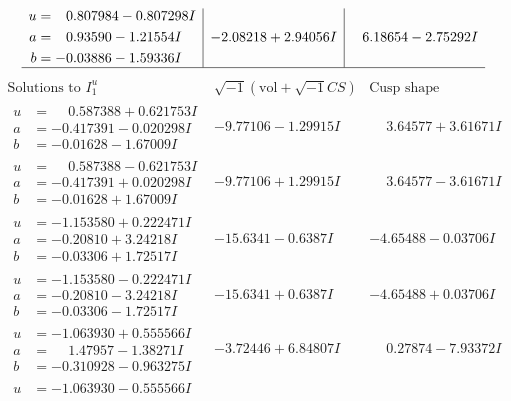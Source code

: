 \documentclass[1p]{elsarticle_modified}
\theoremstyle{definition}
\newcommand{\I}{\sqrt{-1}}
\begin{document}
$$\begin{array}{c|c|c}
\begin{aligned}
u &= \phantom{-}0.807984 - 0.807298 I \\
a &= \phantom{-}0.93590 - 1.21554 I \\
b &= -0.03886 - 1.59336 I\end{aligned}
 & -2.08218 + 2.94056 I & \phantom{-}6.18654 - 2.75292 I\\
 \hline 
 \end{array}$$\newpage$$\begin{array}{c|c|c}  
\text{Solutions to }I^u_{1}& \I (\text{vol} + \sqrt{-1}CS) & \text{Cusp shape}\\
 \hline 
\begin{aligned}
u &= \phantom{-}0.587388 + 0.621753 I \\
a &= -0.417391 - 0.020298 I \\
b &= -0.01628 - 1.67009 I\end{aligned}
 & -9.77106 - 1.29915 I & \phantom{-}3.64577 + 3.61671 I \\ \hline\begin{aligned}
u &= \phantom{-}0.587388 - 0.621753 I \\
a &= -0.417391 + 0.020298 I \\
b &= -0.01628 + 1.67009 I\end{aligned}
 & -9.77106 + 1.29915 I & \phantom{-}3.64577 - 3.61671 I \\ \hline\begin{aligned}
u &= -1.153580 + 0.222471 I \\
a &= -0.20810 + 3.24218 I \\
b &= -0.03306 + 1.72517 I\end{aligned}
 & -15.6341 - 0.6387 I & -4.65488 - 0.03706 I \\ \hline\begin{aligned}
u &= -1.153580 - 0.222471 I \\
a &= -0.20810 - 3.24218 I \\
b &= -0.03306 - 1.72517 I\end{aligned}
 & -15.6341 + 0.6387 I & -4.65488 + 0.03706 I \\ \hline\begin{aligned}
u &= -1.063930 + 0.555566 I \\
a &= \phantom{-}1.47957 - 1.38271 I \\
b &= -0.310928 - 0.963275 I\end{aligned}
 & -3.72446 + 6.84807 I & \phantom{-}0.27874 - 7.93372 I \\ \hline\begin{aligned}
u &= -1.063930 - 0.555566 I \\

\end{aligned}
\end{array}$$
\end{document}
